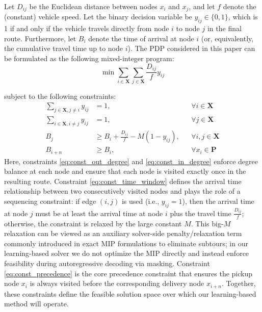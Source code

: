 \documentclass[pdflatex,sn-basic,Numbered]{sn-jnl}
\begin{document}
Let $D_{ij}$ be the Euclidean distance between nodes $x_i$ and $x_j$, and let $f$ denote the (constant) vehicle speed. Let the binary decision variable be $y_{ij} \in \{0, 1\}$, which is 1 if and only if the vehicle travels directly from node $i$ to node $j$ in the final route. Furthermore, let $B_i$ denote the time of arrival at node $i$ (or, equivalently, the cumulative travel time up to node $i$). The PDP considered in this paper can be formulated as the following mixed-integer program:
\begin{equation}
    \min \sum_{i \in \mathbf{X}} \sum_{j \in \mathbf{X}} \frac{D_{ij}}{f} y_{ij}
    \label{eq:objective}
\end{equation}

subject to the following constraints:
\begin{align}
    \sum_{j \in \mathbf{X}, j \neq i} y_{ij} &= 1, && \forall i \in \mathbf{X} \label{eq:const_out_degree} \\
    \sum_{i \in \mathbf{X}, i \neq j} y_{ij} &= 1, && \forall j \in \mathbf{X} \label{eq:const_in_degree} \\
    B_j &\ge B_i + \frac{D_{ij}}{f} - M(1 - y_{ij}), && \forall i, j \in \mathbf{X} \label{eq:const_time_window} \\
    B_{i+n} &\ge B_i, && \forall x_i \in \mathbf{P} \label{eq:const_precedence}
\end{align}
Here, constraints \eqref{eq:const_out_degree} and \eqref{eq:const_in_degree} enforce degree balance at each node and ensure that each node is visited exactly once in the resulting route. Constraint \eqref{eq:const_time_window} defines the arrival time relationship between two consecutively visited nodes and plays the role of a sequencing constraint: if edge $(i,j)$ is used (i.e., $y_{ij} = 1$), then the arrival time at node $j$ must be at least the arrival time at node $i$ plus the travel time $\tfrac{D_{ij}}{f}$; otherwise, the constraint is relaxed by the large constant $M$. This big-$M$ relaxation can be viewed as an auxiliary solver-side penalty/relaxation term commonly introduced in exact MIP formulations to eliminate subtours; in our learning-based solver we do not optimize the MIP directly and instead enforce feasibility during autoregressive decoding via masking. Constraint \eqref{eq:const_precedence} is the core precedence constraint that ensures the pickup node $x_i$ is always visited before the corresponding delivery node $x_{i+n}$. Together, these constraints define the feasible solution space over which our learning-based method will operate.
\end{document}
